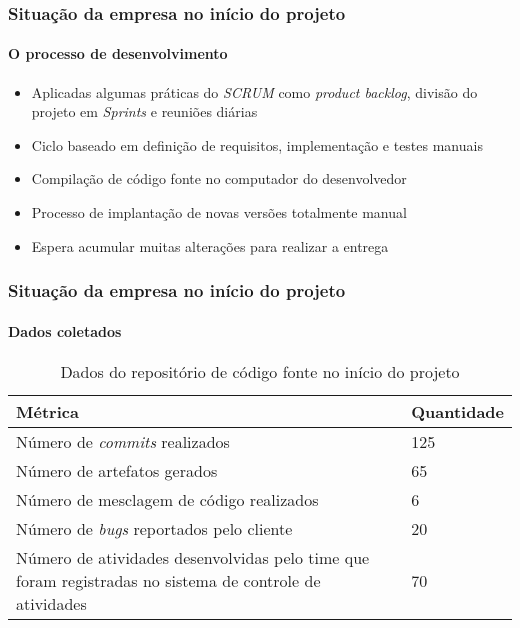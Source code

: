 \documentclass[aspectratio=169]{beamer}
\begin{document}
\begin{frame}
	
	\frametitle{Situação da empresa no início do projeto}
	\framesubtitle{O processo de desenvolvimento}
	
	\begin{itemize}
		
		\item Aplicadas algumas práticas do \textit{SCRUM} como \textit{product backlog}, divisão do projeto em \textit{Sprints} e reuniões diárias
		
		\item Ciclo baseado em definição de requisitos, implementação e testes manuais
		
		\item Compilação de código fonte no computador do desenvolvedor
		
		\item Processo de implantação de novas versões totalmente manual
		
		\item Espera acumular muitas alterações para realizar a entrega
	\end{itemize}
	
\end{frame}


\begin{frame}
	
	\frametitle{Situação da empresa no início do projeto}
	\framesubtitle{Dados coletados}
	
	\begin{table}[htb]
		\caption{Dados do repositório de código fonte no início do projeto}
		
		\label{tab-code-analysis}	
		\begin{tabular}{p{7.15cm}|p{6.0cm}}
			\textbf{Métrica} & \textbf{Quantidade}  \\
			\hline
			Número de \textit{commits} realizados & 125 \\
			\hline
			Número de artefatos gerados & 65 \\
			\hline
			Número de mesclagem de código realizados & 6 \\
			\hline
			Número de \textit{bugs} reportados pelo cliente & 20 \\
			\hline
			Número de atividades desenvolvidas pelo time que foram registradas no sistema de controle de atividades & 70 \\
		\end{tabular}
	\end{table}
	
\end{frame}
\end{document}
